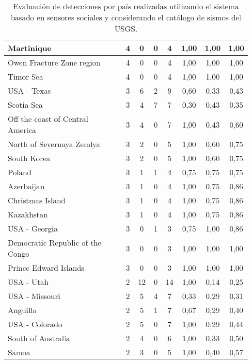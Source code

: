 {\begin{table}[!ht]
\begin{tabular}{|l|ccc|c|ccc|}
Martinique	 & 4 	 & 0   	 & 0   	& 4	 & 1,00 &	1,00 &	1,00 \\ \hline
Owen Fracture Zone region	 & 4 	 & 0   	 & 0   	& 4	 & 1,00 &	1,00 &	1,00 \\ \hline
Timor Sea	 & 4 	 & 0   	 & 0   	& 4	 & 1,00 &	1,00 &	1,00 \\ \hline
USA - Texas	 & 3 	 & 6 	 & 2 	& 9	 & 0,60 &	0,33 &	0,43 \\ \hline
Scotia Sea	 & 3 	 & 4 	 & 7 	& 7	 & 0,30 &	0,43 &	0,35 \\ \hline
Off the coast of Central America	 & 3 	 & 4 	 & 0   	& 7	 & 1,00 &	0,43 &	0,60 \\ \hline
North of Severnaya Zemlya	 & 3 	 & 2 	 & 0   	& 5	 & 1,00 &	0,60 &	0,75 \\ \hline
South Korea	 & 3 	 & 2 	 & 0   	& 5	 & 1,00 &	0,60 &	0,75 \\ \hline
Poland	 & 3 	 & 1 	 & 1 	& 4	 & 0,75 &	0,75 &	0,75 \\ \hline
Azerbaijan	 & 3 	 & 1 	 & 0   	& 4	 & 1,00 &	0,75 &	0,86 \\ \hline
Christmas Island	 & 3 	 & 1 	 & 0   	& 4	 & 1,00 &	0,75 &	0,86 \\ \hline
Kazakhstan	 & 3 	 & 1 	 & 0   	& 4	 & 1,00 &	0,75 &	0,86 \\ \hline
USA - Georgia	 & 3 	 & 0   	 & 1 	& 3	 & 0,75 &	1,00 &	0,86 \\ \hline
Democratic Republic of the Congo	 & 3 	 & 0   	 & 0   	& 3	 & 1,00 &	1,00 &	1,00 \\ \hline
Prince Edward Islands	 & 3 	 & 0   	 & 0   	& 3	 & 1,00 &	1,00 &	1,00 \\ \hline
USA - Utah	 & 2 	 & 12 	 & 0   	& 14	 & 1,00 &	0,14 &	0,25 \\ \hline
USA - Missouri	 & 2 	 & 5 	 & 4 	& 7	 & 0,33 &	0,29 &	0,31 \\ \hline
Anguilla	 & 2 	 & 5 	 & 1 	& 7	 & 0,67 &	0,29 &	0,40 \\ \hline
USA - Colorado	 & 2 	 & 5 	 & 0   	& 7	 & 1,00 &	0,29 &	0,44 \\ \hline
South of Australia	 & 2 	 & 4 	 & 0   	& 6	 & 1,00 &	0,33 &	0,50 \\ \hline
Samoa	 & 2 	 & 3 	 & 0   	& 5	 & 1,00 &	0,40 &	0,57 \\ \hline
   \end{tabular}
  \caption{Evaluación de detecciones por país realizadas utilizando el sistema basado en sensores sociales y considerando el catálogo de sismos del USGS.}
  \label{table:all-detections-04}
\end{table}}


